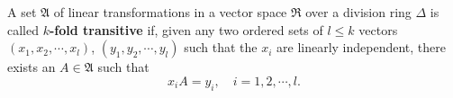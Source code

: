 A set $\mathfrak{A}$ of linear transformations in a vector space $\mathfrak{R}$ over a division ring $\Delta$ is called \textbf{$k$-fold transitive} if, given any two ordered sets of $l \leq k$ vectors $(x_1, x_2, \cdots, x_l)$, $(y_1, y_2, \cdots, y_l)$ such that the $x_i$ are linearly independent, there exists an $A \in \mathfrak{A}$ such that
$$x_i A = y_i, \quad i = 1, 2, \cdots, l.$$
